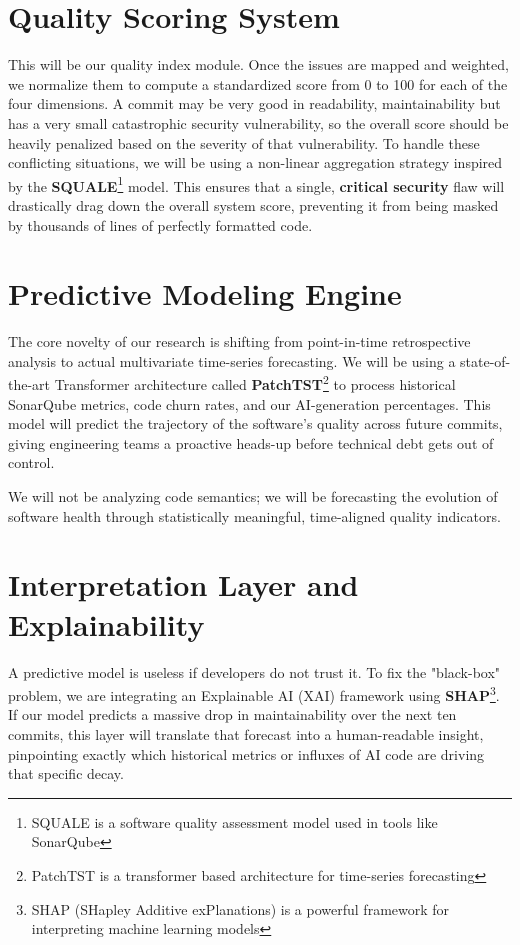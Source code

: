 \section{Quality Scoring System}

This will be our quality index module. Once the issues are mapped and weighted, we normalize them to compute a standardized score from 0 to 100 for each of the four dimensions. A commit may be very good in readability, maintainability but has a very small catastrophic security vulnerability, so the overall score should be heavily penalized based on the severity of that vulnerability. To handle these conflicting situations, we will be using a non-linear aggregation strategy inspired by the \textbf{SQUALE}\footnote{SQUALE is a software quality assessment model used in tools like SonarQube} model. This ensures that a single, \textbf{critical security} flaw will drastically drag down the overall system score, preventing it from being masked by thousands of lines of perfectly formatted code.

\section{Predictive Modeling Engine}

The core novelty of our research is shifting from point-in-time retrospective analysis to actual multivariate time-series forecasting. We will be using a state-of-the-art Transformer architecture called \textbf{PatchTST}\footnote{PatchTST is a transformer based architecture for time-series forecasting} to process historical SonarQube metrics, code churn rates, and our AI-generation percentages. This model will predict the trajectory of the software's quality across future commits, giving engineering teams a proactive heads-up before technical debt gets out of control.  

We will not be analyzing code semantics; we will be forecasting the evolution of software health through statistically meaningful, time-aligned quality indicators.

\section{Interpretation Layer and Explainability}

A predictive model is useless if developers do not trust it. To fix the "black-box" problem, we are integrating an Explainable AI (XAI) framework using \textbf{SHAP}\footnote{SHAP (SHapley Additive exPlanations) is a powerful framework for interpreting machine learning models}. If our model predicts a massive drop in maintainability over the next ten commits, this layer will translate that forecast into a human-readable insight, pinpointing exactly which historical metrics or influxes of AI code are driving that specific decay.

